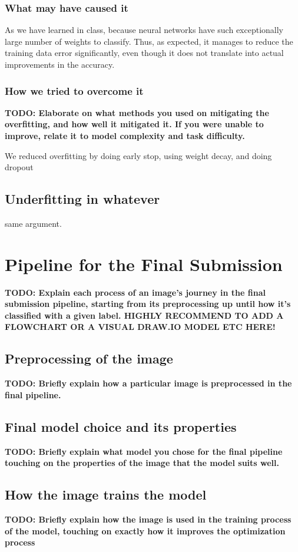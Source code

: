 \documentclass[10pt]{article} %
\begin{document}
\subsubsection{What may have caused it}
As we have learned in class, because neural networks have such exceptionally large number of weights to classify. Thus, as expected, it manages to reduce the training data error significantly, even though it does not translate into actual improvements in the accuracy.

\subsubsection{How we tried to overcome it}
\textbf{TODO: Elaborate on what methods you used on mitigating the overfitting, and how well it mitigated it. If you were unable to improve, relate it to model complexity and task difficulty.}

We reduced overfitting by doing early stop, using weight decay, and doing dropout

\subsection{Underfitting in whatever}
same argument.

\section{Pipeline for the Final Submission}
\textbf{TODO: Explain each process of an image's journey in the final submission pipeline, starting from its preprocessing up until how it's classified with a given label. HIGHLY RECOMMEND TO ADD A FLOWCHART OR A VISUAL DRAW.IO MODEL ETC HERE!}
\subsection{Preprocessing of the image}
\textbf{TODO: Briefly explain how a particular image is preprocessed in the final pipeline.}
\subsection{Final model choice and its properties}
\textbf{TODO: Briefly explain what model you chose for the final pipeline touching on the properties of the image that the model suits well.}
\subsection{How the image trains the model}
\textbf{TODO: Briefly explain how the image is used in the training process of the model, touching on exactly how it improves the optimization process}
\end{document}
